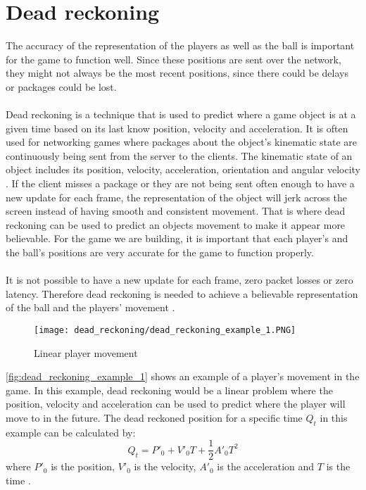 \section{Dead reckoning}
The accuracy of the representation of the players as well as the ball is important for the game to function well.
Since these positions are sent over the network, they might not always be the most recent positions, since there could be delays or packages could be lost.
\\\\
Dead reckoning is a technique that is used to predict where a game object is at a given time based on its last know position, velocity and acceleration.
It is often used for networking games where packages about the object's kinematic state are continuously being sent from the server to the clients.
The kinematic state of an object includes its position, velocity, acceleration, orientation and angular velocity \autocite{DeadReckoning}.
If the client misses a package or they are not being sent often enough to have a new update for each frame, the representation of the object will jerk across the screen instead of having smooth and consistent movement.
That is where dead reckoning can be used to predict an objects movement to make it appear more believable.
For the game we are building, it is important that each player's and the ball's positions are very accurate for the game to function properly.
\\\\
It is not possible to have a new update for each frame, zero packet losses or zero latency. 
Therefore dead reckoning is needed to achieve a believable representation of the ball and the players' movement \autocite{DeadReckoning}.
\begin{figure}[H]
    \centering
    \texttt{[image: dead\_reckoning/dead\_reckoning\_example\_1.PNG]}
    \caption{Linear player movement}
    \label{fig:dead_reckoning_example_1}
\end{figure}
\autoref{fig:dead_reckoning_example_1} shows an example of a player's movement in the game.
In this example, dead reckoning would be a linear problem where the position, velocity and acceleration can be used to predict where the player will move to in the future. 
The dead reckoned position for a specific time $Q_t$ in this example can be calculated by:
\begin{displaymath}
    Q_t = P'_0 + V'_0T + \frac{1}{2}A'_0T^2
\end{displaymath}
where $ P'_0 $ is the position, $ V'_0 $ is the velocity, $ A'_0 $ is the acceleration and $T$ is the time \autocite{DeadReckoning}.
